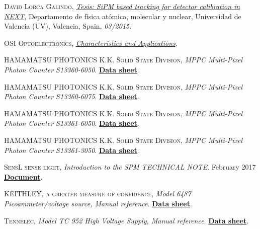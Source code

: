 \begin{thebibliography}{100}
 \textsc{David Lorca Galindo},
\href{https://dialnet.unirioja.es/servlet/tesis?codigo=101465}{\textit{Tesis: SiPM based tracking for detector calibration in NEXT}}, Departamento de física atómica, molecular y nuclear, Universidad de Valencia (UV), Valencia, Spain, \textit{03/2015}.

 \textsc{OSI Optoelectronics}, 
\href{https://osioptoelectronics.com/standard-products/default.aspx?gclid=EAIaIQobChMIkYrLif_37QIVDNTtCh3NuwpkEAAYASAAEgKMJ_D_BwE}{\textit{Characteristics and Applications}}.

 \textsc{HAMAMATSU PHOTONICS K.K. Solid State Division},
\textit{MPPC Multi-Pixel Photon Counter S13360-6050}. \href{https://www.hamamatsu.com/eu/en/product/type/S13360-6050CS/index.html}{\textbf{Data sheet}}.

 \textsc{HAMAMATSU PHOTONICS K.K. Solid State Division},
\textit{MPPC Multi-Pixel Photon Counter S13360-6075}. \href{https://www.hamamatsu.com/eu/en/product/type/S13360-6075CS/index.html}{\textbf{Data sheet}}.

 \textsc{HAMAMATSU PHOTONICS K.K. Solid State Division},
\textit{MPPC Multi-Pixel Photon Counter S13361-6050}. \href{https://www.hamamatsu.com/us/en/product/type/S13361-6050AE-04/index.html}{\textbf{Data sheet}}.

 \textsc{HAMAMATSU PHOTONICS K.K. Solid State Division},
\textit{MPPC Multi-Pixel Photon Counter S13361-3050}. \href{https://www.hamamatsu.com/jp/en/product/type/S13361-3050AE-08/index.html}{\textbf{Data sheet}}.

 \textsc{SensL sense light},
\textit{Introduction to the SPM TECHNICAL NOTE}. February 2017 \href{https://sensl.com/}{\textbf{Document}}.

 \textsc{KEITHLEY, a greater measure of confidence},
\textit{Model 6487 Picoammeter/voltage source, Manual reference}. \href{https://pdf.directindustry.com/pdf/keithley-instruments/6487-picoammeter-voltage-source/1438-619876.html}{\textbf{Data sheet}}.

 \textsc{Tennelec},
\textit{Model TC 952 High Voltage Supply, Manual reference}. \href{https://groups.nscl.msu.edu/nscl_library/manuals/tennelec/tennelec.htm}{\textbf{Data sheet}}.


\end{thebibliography}
